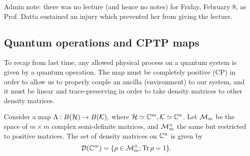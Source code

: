 Admin note: there was no lecture (and hence no notes) for Friday, February 8, as Prof. Datta sustained an injury which prevented her from giving the lecture.

\subsection*{Quantum operations and CPTP maps}
To recap from last time, any allowed physical process on a quantum system is given by a quantum operation. The map must be completely positive (CP) in order to allow us to properly couple an ancilla (environment) to our system, and it must be linear and trace-preserving in order to take density matrices to other density matrices.

Consider a map $\Lambda:B(\mathcal H)\to B(\mathcal{K}),$ where $\mathcal H\simeq \mathbb{C}^m,\mathcal{K}\simeq \mathbb{C}^n$. Let $\mathcal{M}_m$ be the space of $m\times m$ complex semi-definite matrices, and $\mathcal{M}_m^+$ the same but restricted to positive matrices. The set of density matrices on $\mathbb{C}^n$ is given by
\begin{equation}
    \mathcal{D}(\mathbb{C}^m)=\{\rho \in \mathcal{M}_m^+; \operatorname{Tr} \rho = 1\}.
\end{equation}

